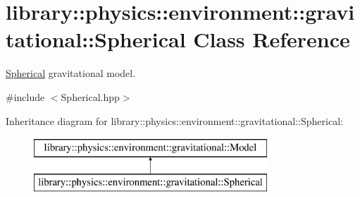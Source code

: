 \hypertarget{classlibrary_1_1physics_1_1environment_1_1gravitational_1_1_spherical}{}\section{library\+:\+:physics\+:\+:environment\+:\+:gravitational\+:\+:Spherical Class Reference}
\label{classlibrary_1_1physics_1_1environment_1_1gravitational_1_1_spherical}


\hyperlink{classlibrary_1_1physics_1_1environment_1_1gravitational_1_1_spherical}{Spherical} gravitational model.  




{\ttfamily \#include $<$Spherical.\+hpp$>$}

Inheritance diagram for library\+:\+:physics\+:\+:environment\+:\+:gravitational\+:\+:Spherical\+:\begin{figure}[H]
\begin{center}
\leavevmode
\includegraphics[height=2.000000cm]{classlibrary_1_1physics_1_1environment_1_1gravitational_1_1_spherical}
\end{center}
\end{figure}
